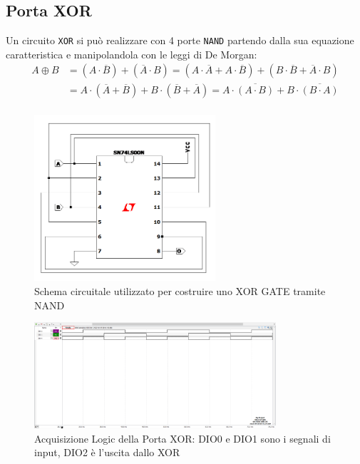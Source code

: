 \documentclass[10pt, a4paper, italian]{article}
\begin{document}
\subsection{Porta XOR}
Un circuito \texttt{XOR} si può realizzare con 4 porte \texttt{NAND} partendo
dalla sua equazione caratteristica e manipolandola con le leggi di De Morgan:
\begin{align*}
  A \oplus B &= (A \cdot \overline{B}) + (\overline{A} \cdot B)
             =  (A \cdot \overline{A} + A \cdot \overline{B}) + (B \cdot \overline{B} + \overline{A} \cdot B) \\
             &= A \cdot (\overline{A} + \overline{B}) + B \cdot (\overline{B} + \overline{A})
             = A \cdot \overline{(A \cdot B)} + B \cdot \overline{(B \cdot A)} \\
\end{align*}
\begin{figure}[htbp]
    \centering
    \includegraphics[width=0.6\textwidth]{NAND_XOR.png}
    \caption{Schema circuitale utilizzato per costruire uno XOR GATE tramite NAND}
    \label{circuito3}
\end{figure}

\begin{figure}[htbp]
    \centering
    \includegraphics[width=0.8\textwidth]{xor_time.png}
    \caption{Acquisizione Logic della Porta XOR: DIO0 e DIO1 sono i segnali di input, DIO2 è l'uscita dallo XOR}
    \label{pat2}
\end{figure}
\end{document}
